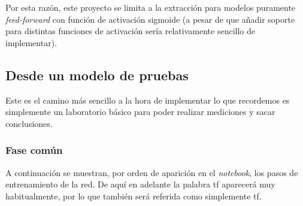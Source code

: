 Por esta razón, este proyecto se limita a la extracción para modelos puramente \textit{feed-forward} con función de activación sigmoide (a pesar de que añadir soporte para distintas funciones de activación sería relativamente sencillo de implementar).

\subsection{Desde un modelo de pruebas}
\label{ssec:desde_modelo_de_pruebas}
Este es el camino más sencillo a la hora de implementar lo que recordemos es simplemente un laboratorio básico para poder realizar mediciones y sacar conclusiones.

\subsubsection{Fase común}
\label{sssec:modelo_pruebas_fase_comun}
A continuación se muestran, por orden de aparición en el \textit{notebook}, los pasos de entrenamiento de la red. De aquí en adelante la palabra \acrlong{tf} aparecerá muy habitualmente, por lo que también será referida como simplemente \acrshort{tf}.


